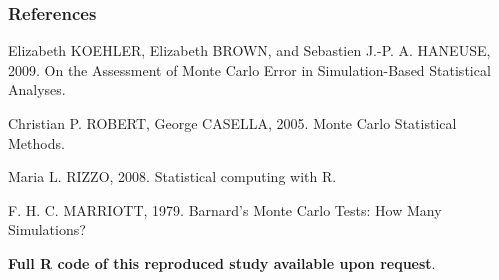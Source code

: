\documentclass[border=5mm, convert, usenames, dvipsnames,beamer]{standalone}
\begin{document}
\begin{frame}[ fragile]{}

\frametitle{References}

\vspace{35}
Elizabeth KOEHLER, Elizabeth BROWN, and Sebastien J.-P. A. HANEUSE, 2009. On the Assessment of Monte Carlo Error in Simulation-Based Statistical Analyses.

\vspace{15}

Christian P. ROBERT, George CASELLA, 2005. Monte Carlo Statistical Methods.

\vspace{15}

Maria L. RIZZO, 2008. Statistical computing with R.

\vspace{15}
F. H. C. MARRIOTT, 1979. Barnard's Monte Carlo Tests: How Many Simulations? 

\vspace{15}
\textbf{Full R code of this reproduced study available upon request}.




\end{frame}
\end{document}
